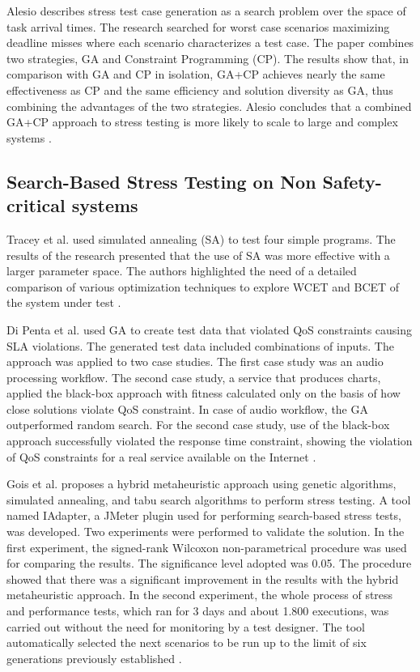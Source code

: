 \documentclass{bmcart}
\begin{document}
Alesio describes stress test case generation as a search problem over the space of task arrival times. The research searched for worst case scenarios maximizing deadline misses where each scenario characterizes a test case. The paper combines two strategies, GA and Constraint Programming (CP). The results show that, in comparison with GA and CP in isolation, GA+CP achieves nearly the same effectiveness as CP and the same efficiency and solution diversity as GA, thus combining the advantages of the two strategies. Alesio concludes that a combined GA+CP approach to stress testing is more likely to scale to large and complex systems \citep{Alesio2015}.

\subsection{Search-Based Stress Testing on Non Safety-critical systems}


Tracey et al. \citep{Tracey1998} used simulated annealing (SA) to test four
simple programs. The results of the research presented that the use of SA was more effective with a larger parameter space. The authors highlighted the need of a detailed comparison of various optimization techniques to explore WCET and BCET of the system under test \citep{Tracey1998}.

Di Penta et al. \citep{Penta2007} used GA to create test data that violated QoS constraints causing SLA violations. The generated test data included combinations of inputs. The approach was applied to two case studies. The first case study was an audio processing workflow. The second case study, a service that produces charts, applied the black-box approach with fitness calculated only on the basis of how close solutions violate QoS constraint. In case of audio workflow, the GA outperformed random search. For the second case study, use of the black-box approach successfully violated the response time constraint, showing the violation of QoS constraints for a real service available on the Internet \citep{Penta2007}.

Gois et al. proposes a hybrid metaheuristic approach using genetic algorithms, simulated annealing, and tabu search algorithms to perform stress testing. A tool named IAdapter, a JMeter plugin used for performing search-based stress tests, was developed. Two experiments were performed to validate the solution. In the first experiment, the signed-rank Wilcoxon non-parametrical procedure was used for comparing the results. The significance level adopted was 0.05. The procedure showed that there was a significant improvement in the results with the hybrid metaheuristic approach.
In the second experiment, the whole process of stress and performance tests, which ran for 3 days and about 1.800 executions, was carried out without the need for monitoring by a test designer. The tool automatically selected the next scenarios to be run up to the limit of six generations previously established \citep{Gois2016}. 
\end{document}

